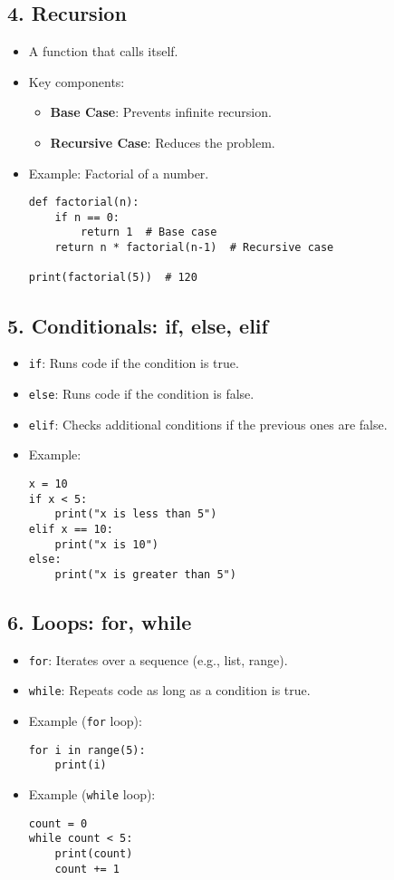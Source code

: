 \subsection*{4. Recursion}
\begin{itemize}
    \item A function that calls itself.
    \item Key components:
    \begin{itemize}
        \item \textbf{Base Case}: Prevents infinite recursion.
        \item \textbf{Recursive Case}: Reduces the problem.
    \end{itemize}
    \item Example: Factorial of a number.
    \begin{verbatim}
def factorial(n):
    if n == 0:
        return 1  # Base case
    return n * factorial(n-1)  # Recursive case

print(factorial(5))  # 120
    \end{verbatim}
\end{itemize}

\subsection*{5. Conditionals: if, else, elif}
\begin{itemize}
    \item \texttt{if}: Runs code if the condition is true.
    \item \texttt{else}: Runs code if the condition is false.
    \item \texttt{elif}: Checks additional conditions if the previous ones are false.
    \item Example:
    \begin{verbatim}
x = 10
if x < 5:
    print("x is less than 5")
elif x == 10:
    print("x is 10")
else:
    print("x is greater than 5")
    \end{verbatim}
\end{itemize}

\subsection*{6. Loops: for, while}
\begin{itemize}
    \item \texttt{for}: Iterates over a sequence (e.g., list, range).
    \item \texttt{while}: Repeats code as long as a condition is true.
    \item Example (\texttt{for} loop):
    \begin{verbatim}
for i in range(5):
    print(i)
    \end{verbatim}
    \item Example (\texttt{while} loop):
    \begin{verbatim}
count = 0
while count < 5:
    print(count)
    count += 1
    \end{verbatim}
\end{itemize}

